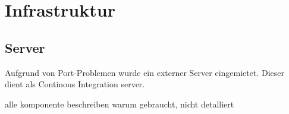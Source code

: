 \newpage

\chapter{Infrastruktur}

\section{Server}
Aufgrund von Port-Problemen wurde ein externer Server eingemietet. 
Dieser dient als Continous Integration server.

alle komponente beschreiben
warum gebraucht, nicht detalliert







